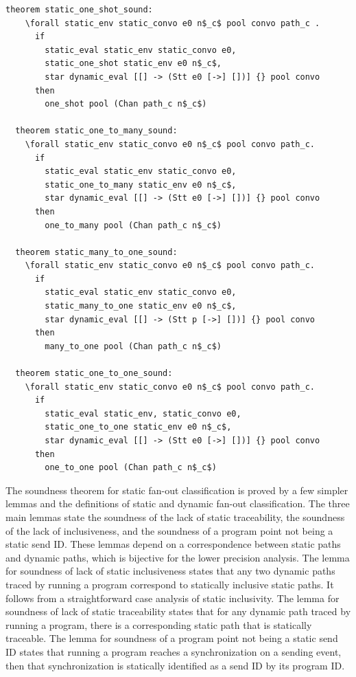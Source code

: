 \documentclass[10pt]{article}
\begin{document}
\begin{lstlisting}[language=logic, mathescape]
  theorem static_one_shot_sound: 
    \forall static_env static_convo e0 n$_c$ pool convo path_c .
      if
        static_eval static_env static_convo e0, 
        static_one_shot static_env e0 n$_c$, 
        star dynamic_eval [[] -> (Stt e0 [->] [])] {} pool convo
      then
        one_shot pool (Chan path_c n$_c$)

  theorem static_one_to_many_sound:
    \forall static_env static_convo e0 n$_c$ pool convo path_c. 
      if 
        static_eval static_env static_convo e0, 
        static_one_to_many static_env e0 n$_c$, 
        star dynamic_eval [[] -> (Stt e0 [->] [])] {} pool convo
      then
        one_to_many pool (Chan path_c n$_c$)

  theorem static_many_to_one_sound:
    \forall static_env static_convo e0 n$_c$ pool convo path_c. 
      if
        static_eval static_env static_convo e0, 
        static_many_to_one static_env e0 n$_c$, 
        star dynamic_eval [[] -> (Stt p [->] [])] {} pool convo
      then
        many_to_one pool (Chan path_c n$_c$)

  theorem static_one_to_one_sound:
    \forall static_env static_convo e0 n$_c$ pool convo path_c. 
      if
        static_eval static_env, static_convo e0, 
        static_one_to_one static_env e0 n$_c$,
        star dynamic_eval [[] -> (Stt e0 [->] [])] {} pool convo
      then
        one_to_one pool (Chan path_c n$_c$)
\end{lstlisting}

The soundness theorem for static fan-out classification is proved
by a few simpler lemmas and the
definitions of static and dynamic fan-out classification.  The three main lemmas state the
soundness of the lack of static traceability, the soundness of the lack of inclusiveness, and
the soundness of a program point not being a static send ID. These lemmas depend on a
correspondence between static paths and dynamic paths, which is bijective for the lower
precision analysis. The lemma for soundness of lack of static inclusiveness states that any two
dynamic paths traced by running a program correspond to statically inclusive static paths. It
follows from a straightforward case analysis of static inclusivity. The lemma for soundness of
lack of static traceability states that for any dynamic path traced by running a program, there
is a corresponding static path that is statically traceable. The lemma for soundness of a
program point not being a static send ID states that running a program reaches a
synchronization on a sending event, then that synchronization is statically identified as a
send ID by its program ID.
\end{document}
